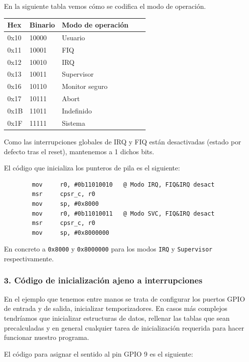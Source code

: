 En la siguiente tabla vemos cómo se codifica el modo de operación.

\begin{longtable}{ p{1.8cm} | p{2cm} | p{5cm} | p{1cm} | p{1cm} }
\hline
{\bf Hex} & {\bf Binario} & {\bf Modo de operación} \\ \hline
0x10 & 10000 & Usuario        \\ \hline
0x11 & 10001 & FIQ            \\ \hline
0x12 & 10010 & IRQ            \\ \hline
0x13 & 10011 & Supervisor     \\ \hline
0x16 & 10110 & Monitor seguro \\ \hline
0x17 & 10111 & Abort          \\ \hline
0x1B & 11011 & Indefinido     \\ \hline
0x1F & 11111 & Sistema        \\ \hline
\end{longtable}

Como las interrupciones globales de IRQ y FIQ están desactivadas (estado por defecto tras
el reset), mantenemos a 1 dichos bits.

El código que inicializa los punteros de pila es el siguiente:

\begin{lstlisting}
        mov     r0, #0b11010010   @ Modo IRQ, FIQ&IRQ desact
        msr     cpsr_c, r0
        mov     sp, #0x8000
        mov     r0, #0b11010011   @ Modo SVC, FIQ&IRQ desact
        msr     cpsr_c, r0
        mov     sp, #0x8000000
\end{lstlisting}

En concreto a {\tt 0x8000} y {\tt 0x8000000} para los modos {\tt IRQ} y
{\tt Supervisor} respectivamente.

\subsubsection{3. Código de inicialización ajeno a interrupciones}

En el ejemplo que tenemos entre manos se trata de configurar los puertos
GPIO de entrada y de salida, inicializar temporizadores. En casos más complejos tendríamos que
inicializar estructuras de datos, rellenar las tablas que sean precalculadas y en general
cualquier tarea de inicialización requerida para hacer funcionar nuestro programa.

El código para asignar el sentido al pin GPIO 9 es el siguiente:

